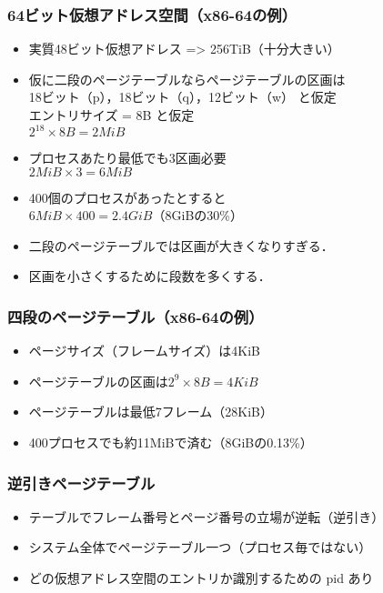 \documentclass[unicode]{beamer}                   %
\begin{document}
\begin{frame}
  \frametitle{64ビット仮想アドレス空間（x86-64の例）}
  \begin{itemize}
  \item 実質48ビット仮想アドレス => 256TiB（十分大きい）
  \item 仮に二段のページテーブルならページテーブルの区画は \\
    18ビット（p），18ビット（q），12ビット（w） と仮定 \\
    エントリサイズ = 8B  と仮定 \\
    $2^{18} \times 8B = 2MiB$
  \item プロセスあたり最低でも3区画必要 \\
    $2MiB \times 3 = 6MiB$
  \item 400個のプロセスがあったとすると \\
    $6MiB \times 400 = 2.4GiB$（8GiBの30\%）
  \item 二段のページテーブルでは区画が大きくなりすぎる．
  \item 区画を小さくするために段数を多くする．
  \end{itemize}
\end{frame}

\begin{frame}
  \frametitle{四段のページテーブル（x86-64の例）}
  \begin{itemize}
  \item ページサイズ（フレームサイズ）は4KiB
  \item ページテーブルの区画は$2^9 \times 8B = 4KiB$
  \item ページテーブルは最低7フレーム（28KiB）
  \item 400プロセスでも約11MiBで済む（8GiBの0.13\%）
  \end{itemize}
\end{frame}

\begin{frame}
  \frametitle{逆引きページテーブル}
  \begin{itemize}
  \item テーブルでフレーム番号とページ番号の立場が逆転（逆引き）
  \item システム全体でページテーブル一つ（プロセス毎ではない）
  \item どの仮想アドレス空間のエントリか識別するための pid あり
  \end{itemize}
\end{frame}
\end{document}
